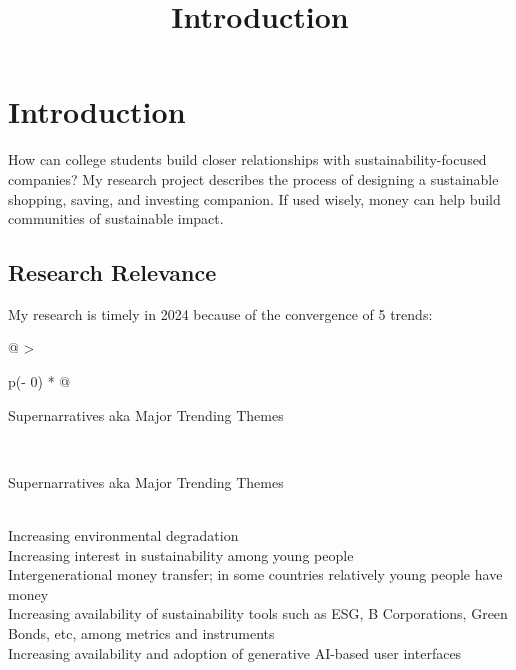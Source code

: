 \documentclass[
  letterpaper,
  DIV=11,
  numbers=noendperiod]{scrartcl}
\title{Introduction}
\author{}
\date{}
\begin{document}
\maketitle

\section{Introduction}\label{introduction}

How can college students build closer relationships with
sustainability-focused companies? My research project describes the
process of designing a sustainable shopping, saving, and investing
companion. If used wisely, money can help build communities of
sustainable impact.

\subsection{Research Relevance}\label{research-relevance}

My research is timely in 2024 because of the convergence of 5 trends:

\begin{longtable}[]{@{}
  >{\raggedright\arraybackslash}p{(\columnwidth - 0\tabcolsep) * }@{}}
\caption{Trends backing the relevance of this research.}\tabularnewline
\toprule\noalign{}
\begin{minipage}[b]{\linewidth}\raggedright
Supernarratives aka Major Trending Themes
\end{minipage} \\
\midrule\noalign{}
\endfirsthead
\toprule\noalign{}
\begin{minipage}[b]{\linewidth}\raggedright
Supernarratives aka Major Trending Themes
\end{minipage} \\
\midrule\noalign{}
\endhead
\bottomrule\noalign{}
\endlastfoot
Increasing environmental degradation \\
Increasing interest in sustainability among young people \\
Intergenerational money transfer; in some countries relatively young
people have money \\
Increasing availability of sustainability tools such as ESG, B
Corporations, Green Bonds, etc, among metrics and instruments \\
Increasing availability and adoption of generative AI-based user
interfaces \\
\end{longtable}
\end{document}
